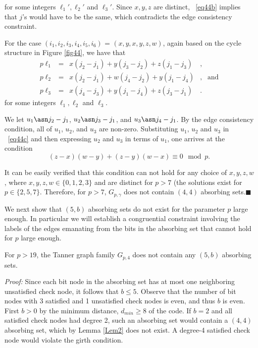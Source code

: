 \noindent for some integers $\ell_1',\ell_2'$ and $\ell_3'$. Since
$x,y,z$ are distinct, ~\eqref{eq44b} implies that $j$'s would have
to be the same, which contradicts the edge consistency constraint.

For the case $(i_1,i_2,i_3,i_4,i_5,i_6)$ = $(x,y,x,y,z,w)$, again
based on the cycle structure in Figure \ref{fig44}, we have that
\begin{equation}\label{eq44c}\begin{array}{ccccc}
p\ell_1&=&x(j_2-j_1)+y(j_3-j_2)+z(j_1-j_3)&,&{}\\
p\ell_2&=&x(j_2-j_1)+w(j_4-j_2)+y(j_1-j_4)&,&\text{and}\\
p\ell_3&=&x(j_4-j_3)+y(j_1-j_4)+z(j_3-j_1)&.&{}
\end{array}\end{equation}
for some integers $\ell_1,\ell_2$ and $\ell_3$.

We let $u_1 \asn j_2-j_1$, $u_2 \asn j_3-j_1$, and $u_3 \asn
j_4-j_1$. By the edge consistency condition, all of $u_1$, $u_2$,
and $u_3$ are non-zero. Substituting $u_1$, $u_2$ and $u_3$ in
~\eqref{eq44c} and then expressing $u_2$ and $u_3$ in terms of
$u_1$, one arrives at the condition
\begin{equation}\label{eq23}
(z-x)(w-y)+(z-y)(w-x) \equiv 0 \mod p.
\end{equation}

It can be easily verified that this condition can not hold for any
choice of $x,y,z,w$, where $x,y,z,w \in \{0,1,2,3 \}$ and are
distinct for $p>7$ (the solutions exist for $p \in \{2,5,7\}$.
Therefore, for $p>7$, $G_{p,\gamma}$ does not contain $(4,4)$
absorbing sets.\hfill$\blacksquare$

We next show that $(5,b)$ absorbing sets do not exist for the
parameter $p$ large enough. In particular we will establish a
congruential constraint involving the labels of the edges
emanating from the bits in the absorbing set that cannot hold for
$p$ large enough.
\begin{lemma}\label{Lem3} For $p>19$, the Tanner graph family $G_{p,4}$
does not contain any $(5,b)$ absorbing sets.
 \end{lemma}

\noindent \textit{Proof:} Since each bit node in the absorbing set
has at most one neighboring unsatisfied check node, it follows
that $b \leq 5$. Observe that the number of bit nodes with 3
satisfied and 1 unsatisfied check nodes is even, and thus $b$ is
even. First $b>0$ by the minimum distance, $d_{min}\geq 8$
\cite{helles} of the code. If $b=2$ and all satisfied check nodes
had degree 2, such an absorbing set would contain a $(4,4)$
absorbing set, which by Lemma \ref{Lem2} does not exist. A
degree-4 satisfied check node would violate the girth condition.


